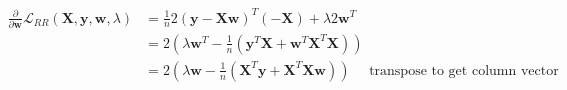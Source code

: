 \newcommand{\matrix}[1]{\mathbf{#1}}
\newcommand{\vector}[1]{\mathbf{#1}}
\newcommand{\X}{\matrix{X}}
\newcommand{\y}{\vector{y}}
\newcommand{\w}{\vector{w}}
\begin{align*}
\frac{\partial}{\partial \w} \mathcal{L}_{RR} (\X,\y,\w,\lambda) &= \frac{1}{n} 2(\y - \X\w)^T (-\X) + \lambda 2 \w^T \\
&= 2 \left( \lambda \w^T - \frac{1}{n}(\y^T\X + \w^T\X^T\X) \right) \\
&= 2 \left( \lambda \w - \frac{1}{n}(\X^T\y + \X^T\X\w) \right) \quad \text{ transpose to get column vector} \\
\end{align*}
